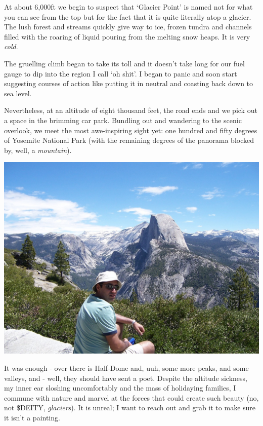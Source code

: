 \documentclass[a5paper,titlepage,11pt]{book}
\begin{document}
At about 6,000ft we begin to suspect that `Glacier Point' is named not for what you can see from the top but for the fact that it is quite literally atop a glacier.  The lush forest and streams quickly give way to ice, frozen tundra and channels filled with the roaring of liquid pouring from the melting snow heaps.  It is very \emph{cold}.

The gruelling climb began to take its toll and it doesn't take long for our fuel gauge to dip into the region I call `oh shit'.  I began to panic and soon start suggesting courses of action like putting it in neutral and coasting back down to sea level.

Nevertheless, at an altitude of eight thousand feet, the road ends and we pick out a space in the brimming car park.  Bundling out and wandering to the scenic overlook, we meet the most awe-inspiring sight yet: one hundred and fifty degrees of Yosemite National Park (with the remaining degrees of the panorama blocked by, well, a \emph{mountain}).

\begin{center}\includegraphics[width=\textwidth]{gfx/100_1213}\end{center}

It was enough - over there is Half-Dome and, uuh, some more peaks, and some valleys, and - well, they should have sent a poet.  Despite the altitude sickness, my inner ear sloshing uncomfortably and the mass of holidaying families, I commune with nature and marvel at the forces that could create such beauty (no, not \$DEITY, \emph{glaciers}).  It is unreal; I want to reach out and grab it to make sure it isn't a painting.
\end{document}
